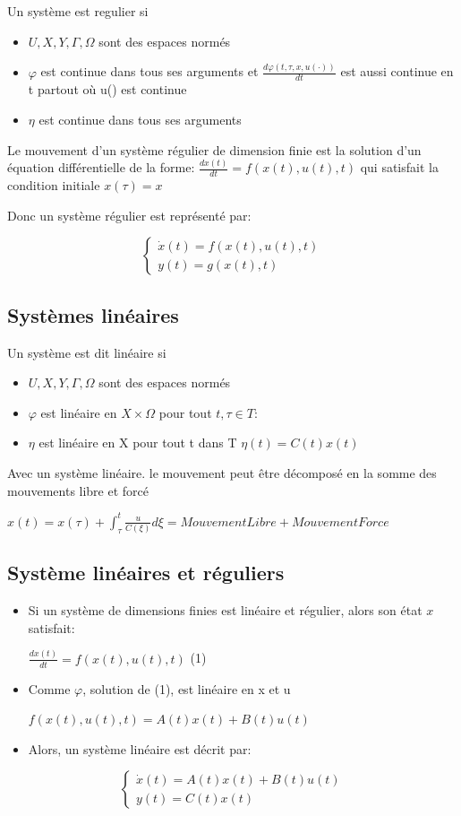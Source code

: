 \documentclass[resume]{subfiles}
\begin{document}
Un système est regulier si
\begin{itemize}
\item $U, X, Y, \Gamma, \Omega$  sont des espaces normés
\item $\varphi$ est continue dans tous ses arguments et $\frac{d\varphi(t,\tau,x,u(\cdot))}{dt}$ est aussi
continue en t partout où u() est continue
\item $\eta$ est continue dans tous ses arguments  
\end{itemize}

Le mouvement d’un système régulier de dimension finie est la solution d’un équation différentielle de la forme: $\frac{dx(t)}{dt}=f(x(t),u(t),t)$ qui satisfait la condition initiale $x(\tau) = x$

Donc un système régulier est représenté par:

\begin{equation}
\begin{cases}
  \dot{x}(t)=f(x(t),u(t),t)\\
   y(t)=g(x(t),t)
\end{cases}
\end{equation}

\subsection{Systèmes linéaires}

Un système est dit linéaire si
\begin{itemize}
\item $U, X, Y, \Gamma, \Omega$  sont des espaces normés
\item $\varphi$ est linéaire en $X \times \Omega$ pour tout $t,\tau\in T$:
\item $\eta$ est linéaire en X pour tout t dans T $\eta(t) = C(t)x(t)$ 
\end{itemize}

Avec un système linéaire. le mouvement peut être
décomposé en la somme des mouvements libre et forcé  

$x(t) = x(\tau) + \int^t_{\tau}\frac{u}{C(\xi)}d\xi = MouvementLibre + MouvementForce$  

\subsection{Système linéaires et réguliers}
\begin{itemize}
\item Si un système de dimensions finies est linéaire et régulier,
  alors son état $x$ satisfait:

  $\frac{dx(t)}{dt} = f(x(t), u(t), t)$ (1)

\item Comme $\varphi$, solution de (1), est linéaire en x et u

  $f(x(t), u(t), t) = A(t)x(t) + B(t)u(t)$ 

\item Alors, un système linéaire est décrit par:
\end{itemize}

\begin{equation}
\begin{cases}
  \dot{x}(t)=A(t)x(t) + B(t)u(t)\\ 
  y(t) = C(t)x(t)
\end{cases}
\end{equation}
\end{document}
